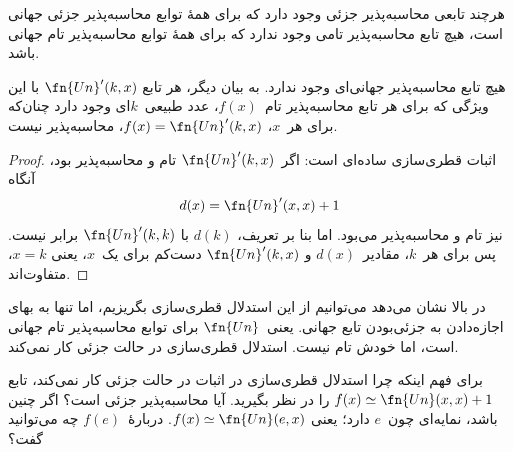 \documentclass[../../../include/open-logic-section]{subfiles}
\begin{document}

هرچند تابعی محاسبه‌پذیر جزئی وجود دارد که برای همهٔ توابع محاسبه‌پذیر
جزئی جهانی است، هیچ تابع محاسبه‌پذیر تامی وجود ندارد که برای همهٔ
توابع محاسبه‌پذیر تام جهانی باشد.

\begin{thm}
هیچ تابع محاسبه‌پذیر جهانی‌ای وجود ندارد. به بیان دیگر، هر تابع
$\fn{Un}'(k,x)$ با این ویژگی که برای هر تابع محاسبه‌پذیر تام~$f(x)$،
عدد طبیعی~$k$ای وجود دارد چنان‌که برای هر~$x$،
$f(x)=\fn{Un}'(k,x)$، محاسبه‌پذیر نیست.
\end{thm}

\begin{proof}
اثبات قطری‌سازی ساده‌ای است: اگر~$\fn{Un}'(k,x)$ تام و محاسبه‌پذیر
بود، آنگاه
\[
d(x) = \fn{Un}'(x, x) + 1
\]
نیز تام و محاسبه‌پذیر می‌بود. اما بنا بر تعریف، $d(k)$ با
$\fn{Un}'(k,k)$ برابر نیست. پس برای هر~$k$، مقادیر~$d(x)$ و
$\fn{Un}'(k,x)$ دست‌کم برای یک~$x$، یعنی $x=k$، متفاوت‌اند.
\end{proof}

\begin{explain}
 در بالا نشان می‌دهد می‌توانیم از این استدلال
قطری‌سازی بگریزیم، اما تنها به بهای اجازه‌دادن به جزئی‌بودن تابع جهانی.
یعنی~$\fn{Un}$ برای توابع محاسبه‌پذیر تام جهانی است، اما خودش تام
نیست. استدلال قطری‌سازی در حالت جزئی کار نمی‌کند.
\end{explain}

\begin{prob}
  برای فهم اینکه چرا استدلال قطری‌سازی در اثبات
   در حالت جزئی کار نمی‌کند، تابع
  $f(x) \simeq \fn{Un}(x,x)+1$ را در نظر بگیرید. آیا محاسبه‌پذیر جزئی
  است؟ اگر چنین باشد، نمایه‌ای چون~$e$ دارد؛ یعنی
  $f(x) \simeq \fn{Un}(e,x)$. دربارهٔ~$f(e)$ چه می‌توانید گفت؟
\end{prob}
\end{document}
